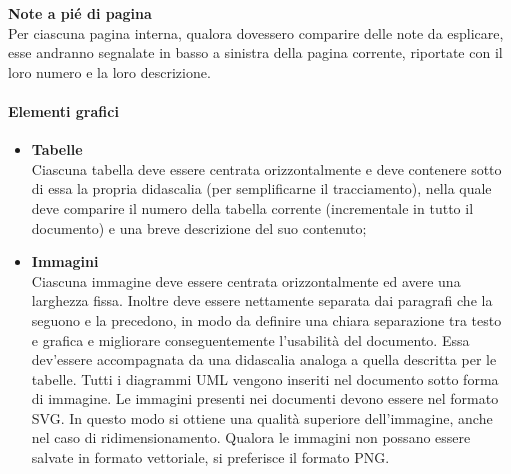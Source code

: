   \textbf{Note a pié di pagina} \\
  Per ciascuna pagina interna, qualora dovessero comparire delle note da esplicare, esse andranno segnalate in
  basso a sinistra della pagina corrente, riportate con il loro numero e la loro descrizione.
	

\paragraph*{Elementi grafici}
\begin{itemize}
	\item \textbf{Tabelle} \\
		Ciascuna tabella deve essere centrata orizzontalmente e deve contenere sotto di essa la propria
		didascalia (per semplificarne il tracciamento), nella quale deve comparire il numero della tabella corrente (incrementale in tutto
		il documento) e una breve descrizione del suo contenuto;
	\item \textbf{Immagini} \\
		Ciascuna immagine deve essere centrata orizzontalmente ed avere una larghezza fissa. Inoltre deve
		essere nettamente separata dai paragrafi che la seguono e la precedono, in modo da definire una
		chiara separazione tra testo e grafica e migliorare conseguentemente l'usabilità del documento. Essa dev’essere
		accompagnata da una didascalia analoga a quella descritta per le tabelle. Tutti i diagrammi
		UML vengono inseriti nel documento sotto forma di immagine.
	        Le immagini presenti nei documenti devono essere nel formato SVG.
		In questo modo si ottiene una qualità superiore dell'immagine, anche nel caso di ridimensionamento. 
		Qualora le immagini non possano essere salvate in formato vettoriale, si preferisce il formato PNG.

\end{itemize}

